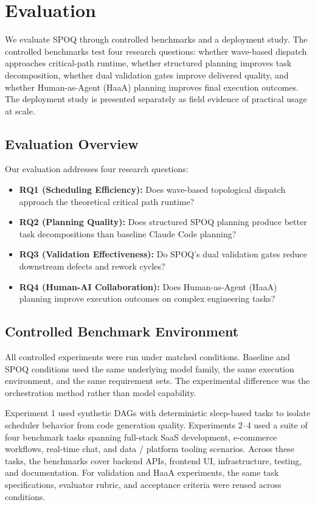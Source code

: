 \section{Evaluation}
\label{sec:evaluation}

We evaluate SPOQ through controlled benchmarks and a deployment study. The controlled benchmarks test four research questions: whether wave-based dispatch approaches critical-path runtime, whether structured planning improves task decomposition, whether dual validation gates improve delivered quality, and whether Human-as-Agent (HaaA) planning improves final execution outcomes. The deployment study is presented separately as field evidence of practical usage at scale.

\subsection{Evaluation Overview}

Our evaluation addresses four research questions:

\begin{itemize}
    \item \textbf{RQ1 (Scheduling Efficiency):} Does wave-based topological dispatch approach the theoretical critical path runtime?
    \item \textbf{RQ2 (Planning Quality):} Does structured SPOQ planning produce better task decompositions than baseline Claude Code planning?
    \item \textbf{RQ3 (Validation Effectiveness):} Do SPOQ's dual validation gates reduce downstream defects and rework cycles?
    \item \textbf{RQ4 (Human-AI Collaboration):} Does Human-as-Agent (HaaA) planning improve execution outcomes on complex engineering tasks?
\end{itemize}

\subsection{Controlled Benchmark Environment}

All controlled experiments were run under matched conditions. Baseline and SPOQ conditions used the same underlying model family, the same execution environment, and the same requirement sets. The experimental difference was the orchestration method rather than model capability.

Experiment 1 used synthetic DAGs with deterministic sleep-based tasks to isolate scheduler behavior from code generation quality. Experiments 2--4 used a suite of four benchmark tasks spanning full-stack SaaS development, e-commerce workflows, real-time chat, and data / platform tooling scenarios. Across these tasks, the benchmarks cover backend APIs, frontend UI, infrastructure, testing, and documentation. For validation and HaaA experiments, the same task specifications, evaluator rubric, and acceptance criteria were reused across conditions.

